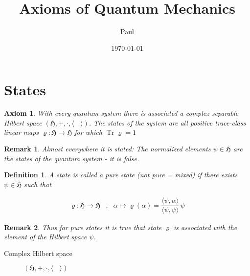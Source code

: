 \documentclass{article}
\title{Axioms of Quantum Mechanics}
\author{Paul}
\date{\today}
\newtheorem{axiom}{Axiom}
\newtheorem{definition}{Definition}
\newtheorem{remark}{Remark}
\DeclareMathOperator{\tr}{Tr}
\begin{document}
\maketitle

\section{States}

\begin{axiom}
With every quantum system there is associated a complex separable Hilbert space $(\mathfrak{H}, +, \cdot, \langle\phantom{m}\rangle)$. The states of the system are all positive trace-class linear maps $\varrho:\mathfrak{H}\rightarrow\mathfrak{H}$ for which $\tr\varrho = 1$
\end{axiom}

\begin{remark}
Almost everywhere it is stated:
The normalized elements $\psi\in\mathfrak{H}$ are the states of the quantum system - it is false.
\end{remark}

\begin{definition}
A state is called a pure state (not pure = mixed) if there exists $\psi\in\mathfrak{H}$ such that

\begin{align*}
\varrho:\mathfrak{H}\rightarrow\mathfrak{H} & , & \alpha \mapsto \varrho(\alpha) = \dfrac{\langle\psi,\alpha\rangle}{\langle\psi,\psi\rangle}\,\psi
\end{align*}

\end{definition}

\begin{remark}
Thus for pure states it is true that state $\varrho$ is associated with the element of the Hilbert space $\psi$.
\end{remark}

\begin{description}
\item[Complex Hilbert space] $(\mathfrak{H}, +, \cdot, \langle\phantom{m}\rangle)$
\end{description}
\end{document}

